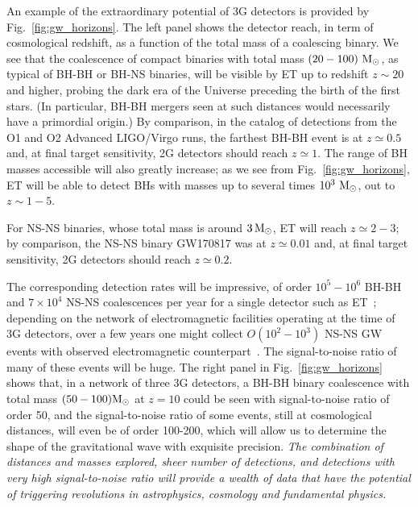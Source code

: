 An example of   the extraordinary potential of 3G detectors is provided  by Fig.~\ref{fig:gw_horizons}. The left panel shows the detector reach, in term of cosmological redshift, as a function of the total mass of a coalescing binary. We see that the coalescence of  compact binaries with total mass  $(20-100)~\mathrm{M}_{\odot}$, as typical of BH-BH or BH-NS binaries, will be visible by ET up to redshift $z\sim 20$ and higher, probing the dark era of the Universe preceding the birth of the first stars. (In particular, BH-BH mergers seen at such distances would necessarily have a primordial origin.)
By comparison, in the catalog of  detections from the O1 and O2 Advanced LIGO/Virgo runs, the farthest BH-BH event is at $z\simeq 0.5$ and, at final target sensitivity, 2G detectors should reach $z\simeq 1$. The range of BH masses accessible will also greatly increase; as we see from  Fig.~\ref{fig:gw_horizons}, ET will be able to detect BHs with masses up to several times $10^3~\mathrm{M}_{\odot}$, out to $z\sim 1-5$.

For NS-NS binaries, whose  total mass is around $3\,\mathrm{M}_{\odot}$,  ET will reach $z\simeq 2-3$; by comparison, the NS-NS binary GW170817 was at $z\simeq 0.01$ and, at final target sensitivity, 2G detectors should reach $z\simeq 0.2$.

The corresponding detection rates will be impressive, of order $10^5-10^6$ BH-BH and $7\times 10^4$ NS-NS coalescences per year for a single detector such as ET~\cite{Regimbau:2012ir,Regimbau:2014uia,Belgacem:2019tbw}; depending on the network of electromagnetic facilities operating at the time of 3G detectors, over a few years one might collect $O(10^2-10^3)$ NS-NS GW events with observed electromagnetic counterpart~\cite{Belgacem:2019tbw}. The signal-to-noise ratio of many of these events will be huge.
The right panel in Fig.~\ref{fig:gw_horizons} shows that, in a network of three 3G detectors,  a BH-BH binary coalescence with total mass $(50-100) \mathrm{M}_{\odot}$ at $z=10$  could be seen  with signal-to-noise ratio of order 50, and the signal-to-noise ratio of some events, still at cosmological distances, will  even be of order 100-200, which will allow us to determine the shape of the gravitational wave with exquisite precision.
{\em The combination of distances and masses explored, sheer number of detections, and detections with very high signal-to-noise ratio will provide a wealth of data that have the potential of triggering revolutions in astrophysics, cosmology and fundamental physics.} 



